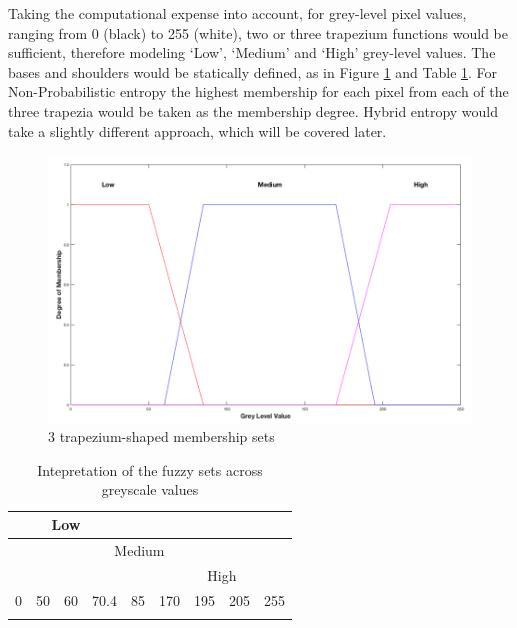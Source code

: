 Taking the computational expense into account, for grey-level pixel values, ranging from 0 (black) to 255 (white), two or three trapezium functions would be sufficient, therefore modeling `Low', `Medium' and `High' grey-level values. The bases and shoulders would be statically defined, as in Figure \ref{fig:3-trapeziums} and Table \ref{table:values}. For Non-Probabilistic entropy the highest membership for each pixel from each of the three trapezia would be taken as the membership degree. Hybrid entropy would take a slightly different approach, which will be covered later.

\begin{figure}[H]
  \center
  \includegraphics[scale=0.4]{Chapter2/hybrid-img/3_traps.png}
  \caption{3 trapezium-shaped membership sets}
  \label{fig:3-trapeziums}
\end{figure}

\begin{table}
  \center
  \begin{tabular}{ |l|l|l|l|l|l|l|l|l| }
    \hline
    \multicolumn{4}{|c|}{Low} & \multicolumn{5}{|c|}{} \\
    \hline
    \multicolumn{2}{|c|}{} & \multicolumn{5}{|c|}{Medium} & \multicolumn{2}{|c|}{}  \\
    \hline
    \multicolumn{5}{|c|}{} & \multicolumn{4}{|c|}{High} \\
    \hline
    0 & 50 & 60 & 70.4 & 85 & 170 & 195 & 205 & 255 \\
    \hline
    \cellcolor[gray]{0} & \cellcolor[gray]{0.19} & \cellcolor[gray]{0.24} & \cellcolor[gray]{0.28} & \cellcolor[gray]{0.33} & \cellcolor[gray]{0.66} & \cellcolor[gray]{0.76} & \cellcolor[gray]{0.8} & \cellcolor[gray]{1} \\ \hline
  \end{tabular}
\caption{Intepretation of the fuzzy sets across greyscale values}
\label{table:values}
\end{table}

